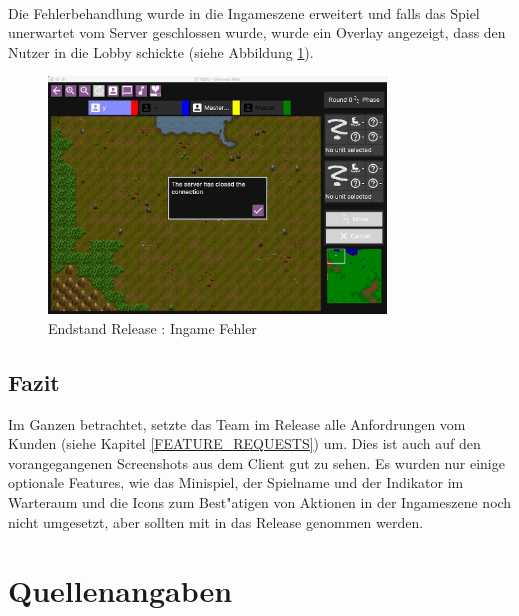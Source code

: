 \documentclass[12pt, titlepage]{scrartcl}
\newcommand{\RN}[1]{%
	\textup{\uppercase\expandafter{\romannumeral#1}}%
}
\begin{document}
					\ \\ Die Fehlerbehandlung wurde in die Ingameszene erweitert und falls das Spiel unerwartet vom Server geschlossen wurde, wurde ein Overlay angezeigt, dass den Nutzer in die Lobby schickte (siehe Abbildung \ref{End_Failure}).
					\begin{figure}[H] 
						\centering
						\includegraphics[width=0.8\textwidth]{images/endOfRelease/Failure.png}
						\caption{Endstand Release \RN{3}: Ingame Fehler}
						\label{End_Failure}
					\end{figure}
		\subsection{Fazit}
			Im Ganzen betrachtet, setzte das Team im Release \RN{3} alle Anfordrungen vom Kunden (siehe Kapitel \ref{FEATURE_REQUESTS}) um. Dies ist auch auf den vorangegangenen Screenshots aus dem Client gut zu sehen. Es wurden nur einige optionale Features, wie das Minispiel, der Spielname und der Indikator im Warteraum und die Icons zum Best"atigen von Aktionen in der Ingameszene noch nicht umgesetzt, aber sollten mit in das Release \RN{4} genommen werden.
	\newpage
	\section{Quellenangaben}
		\listoffigures
		\listoftables
\end{document}
